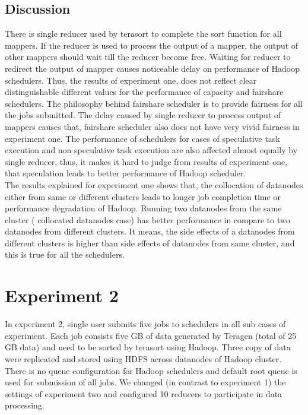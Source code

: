 \subsection{Discussion}

There is single reducer used by terasort to complete the sort function for all mappers. If the reducer is used to process the output of a mapper, the output of other mappers should wait till the reducer become free. Waiting for reducer to redirect the output of mapper causes noticeable delay on performance of Hadoop schedulers. Thus, the results of experiment one, does not reflect clear distinguishable different values for the performance of capacity and fairshare schedulers. The philosophy behind fairshare scheduler is to provide fairness for all the jobs submitted.  The delay caused by single reducer to process output of mappers causes that, fairshare scheduler also does not have very vivid fairness in experiment one. The performance of schedulers for cases of speculative task execution and non speculative task execution are also affected almost equally by single reducer, thus, it makes it hard to judge from results of experiment one, that speculation leads to better performance of Hadoop scheduler. \\ 

The results explained for experiment one shows that, the collocation of datanodes either from same or different clusters leads to longer job completion time or performance degradation of Hadoop. Running two datanodes from the same cluster ( collocated datanodes case)‌ has better performance in compare to two datanodes from different clusters. It means, the side effects of a datanodes from different clusters is higher than side effects of datanodes from same cluster, and this is true for all the schedulers. \\  
  




 


\section{Experiment 2}

In experiment 2, single user submits five jobs to schedulers in all sub cases of experiment. Each job consists five GB‌ of data generated by Teragen (total of 25 GB data) and need to be sorted by terasort using Hadoop. Three copy of data were replicated and stored using HDFS‌ across datanodes of Hadoop cluster. There is no queue configuration for Hadoop schedulers and default root queue is  used for submission of all jobs. We changed (in contrast to experiment 1) the settings of experiment two and configured 10 reducers to participate in data processing. ‌ 




